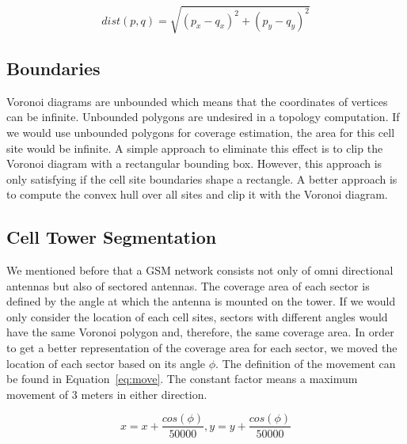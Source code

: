 \documentclass[master,english]{hgbthesis}
\begin{document}
\begin{equation}

	dist(p,q)=\sqrt{\left(p_x-q_x\right)^2+\left(p_y-q_y\right)^2}

\end{equation}

\subsection{Boundaries}

\label{sec:boundaries}

Voronoi diagrams are unbounded which means that the coordinates of vertices can be infinite. Unbounded polygons are undesired in a topology computation. If we would use unbounded polygons for coverage estimation, the area for this cell site would be infinite. A simple approach to eliminate this effect is to clip the Voronoi diagram with a rectangular bounding box. However, this approach is only satisfying if the cell site boundaries shape a rectangle. A better approach is to compute the convex hull over all sites and clip it with the Voronoi diagram.

\subsection{Cell Tower Segmentation}

We mentioned before that a GSM network consists not only of omni directional antennas but also of sectored antennas. The coverage area of each sector is defined by the angle at which the antenna is mounted on the tower. If we would only consider the location of each cell sites, sectors with different angles would have the same Voronoi polygon and, therefore, the same coverage area. In order to get a better representation of the coverage area for each sector, we moved the location of each sector based on its angle $\phi$. The definition of the movement can be found in Equation~\ref{eq:move}. The constant factor means a maximum movement of 3 meters in either direction.

\begin{equation}

	\label{eq:move}

	x=x+\frac{cos(\phi)}{50000},y=y+\frac{cos(\phi)}{50000}

\end{equation}%


\end{document}

